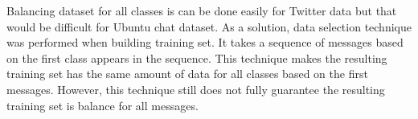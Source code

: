 
Balancing dataset for all classes is can be done easily for Twitter data but that would be difficult for Ubuntu chat dataset.
As a solution, data selection technique was performed when building training set.
It takes a sequence of messages based on the first class appears in the sequence.
This technique makes the resulting training set has the same amount of data for all classes based on the first messages.
However, this technique still does not fully guarantee the resulting training set is balance for all messages.


\begin{comment}
To summarize: in order to predict emoticons in sequence of messages, the positivity, neutrality or negativity of each message must be determined. By preprocessing each message and extracting features, the "gist" of each message is extracted. This "gist" is used to train a first-order Hidden Markov Model, which can then be used to predict the emoticon of messages. However, in order to label the training data correctly, first all messages must be labelled. To do this, a perceptron is used. When training all of the models, it is imperative to select balanced data to train each model in order to achieve optimal prediction.
\end{comment}
